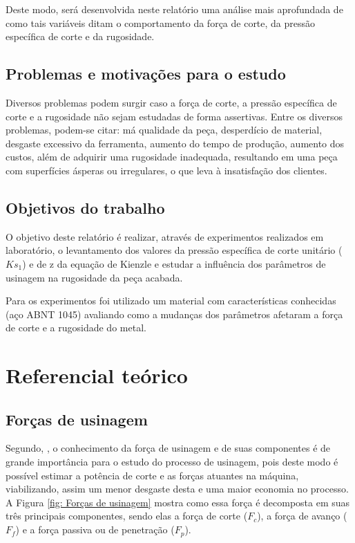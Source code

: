 \documentclass[deposito, acronym, symbols]{fei}
\begin{document}
Deste modo, será desenvolvida neste relatório uma análise mais aprofundada de como tais variáveis ditam o comportamento da força de corte, da pressão específica de corte e da rugosidade. 

\section{Problemas e motivações para o estudo}

Diversos problemas podem surgir caso a força de corte, a pressão específica de corte e a rugosidade não sejam estudadas de forma assertivas. Entre os diversos problemas, podem-se citar:  má qualidade da peça, desperdício de material, desgaste excessivo da ferramenta, aumento do tempo de produção, aumento dos custos, além de adquirir uma rugosidade inadequada, resultando em uma peça com superfícies ásperas ou irregulares, o que leva à insatisfação dos clientes. 

\section{Objetivos do trabalho}

O objetivo deste relatório é realizar, através de experimentos realizados em laboratório, o levantamento  dos valores da pressão específica de corte unitário ($Ks_1$) e de z da equação de Kienzle e estudar a influência dos parâmetros de usinagem na rugosidade da peça acabada. 

Para os experimentos foi utilizado um material com características conhecidas (aço ABNT 1045) avaliando como a mudanças dos parâmetros afetaram a força de corte e a rugosidade do metal.

\chapter{Referencial teórico}

\section{Forças de usinagem}

Segundo, \textcite{machado2015teoria},  %
o conhecimento da força de usinagem e de suas componentes é de grande importância para o estudo do processo de usinagem, pois deste modo é possível estimar a potência de corte e as forças atuantes na máquina, viabilizando, assim um menor desgaste desta e uma maior economia no processo. 
A Figura \ref{fig: Forças de usinagem} mostra como essa força é decomposta em suas três principais componentes, sendo elas a força de corte ($F_c$), a força de avanço ($F_f$) e a força passiva ou de penetração ($F_p$).
\end{document}

